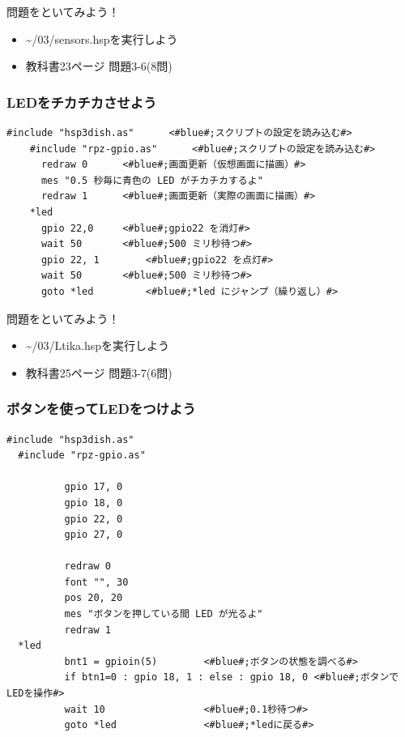 \begin{frame}
  \begin{exampleblock}{問題をといてみよう！}
    \begin{itemize}
      \item \sim/03/sensors.hspを実行しよう
      \item 教科書23ページ 問題3-6(8問)
    \end{itemize}
  \end{exampleblock} 
\end{frame}


\begin{frame}[fragile]
  \frametitle{LEDをチカチカさせよう}
  \begin{lstlisting}[title=\sim/03/Ltika.hsp,label=Ltika.hsp]
    #include "hsp3dish.as"		<#blue#;スクリプトの設定を読み込む#>
    #include "rpz-gpio.as"		<#blue#;スクリプトの設定を読み込む#>
      redraw 0		<#blue#;画面更新（仮想画面に描画）#>
      mes "0.5 秒毎に青色の LED がチカチカするよ"
      redraw 1		<#blue#;画面更新（実際の画面に描画）#>
    *led
      gpio 22,0		<#blue#;gpio22 を消灯#>
      wait 50 		<#blue#;500 ミリ秒待つ#>
      gpio 22, 1 		<#blue#;gpio22 を点灯#>
      wait 50 		<#blue#;500 ミリ秒待つ#>
      goto *led 		<#blue#;*led にジャンプ（繰り返し）#>
  \end{lstlisting}
\end{frame}

\begin{frame}
  \begin{exampleblock}{問題をといてみよう！}
    \begin{itemize}
      \item \sim/03/Ltika.hspを実行しよう
      \item 教科書25ページ 問題3-7(6問)
    \end{itemize}
  \end{exampleblock} 
\end{frame}

\begin{frame}[fragile]
  \frametitle{ボタンを使ってLEDをつけよう}
  \begin{lstlisting}[title=\sim/03/button\_led.hsp, label=button_led.hsp]
  #include "hsp3dish.as"
  #include "rpz-gpio.as"
  
          gpio 17, 0
          gpio 18, 0
          gpio 22, 0
          gpio 27, 0

          redraw 0
          font "", 30
          pos 20, 20
          mes "ボタンを押している間 LED が光るよ"
          redraw 1
  *led
          bnt1 = gpioin(5)        <#blue#;ボタンの状態を調べる#>
          if btn1=0 : gpio 18, 1 : else : gpio 18, 0 <#blue#;ボタンでLEDを操作#>
          wait 10                 <#blue#;0.1秒待つ#>
          goto *led               <#blue#;*ledに戻る#>
  \end{lstlisting}
\end{frame}

